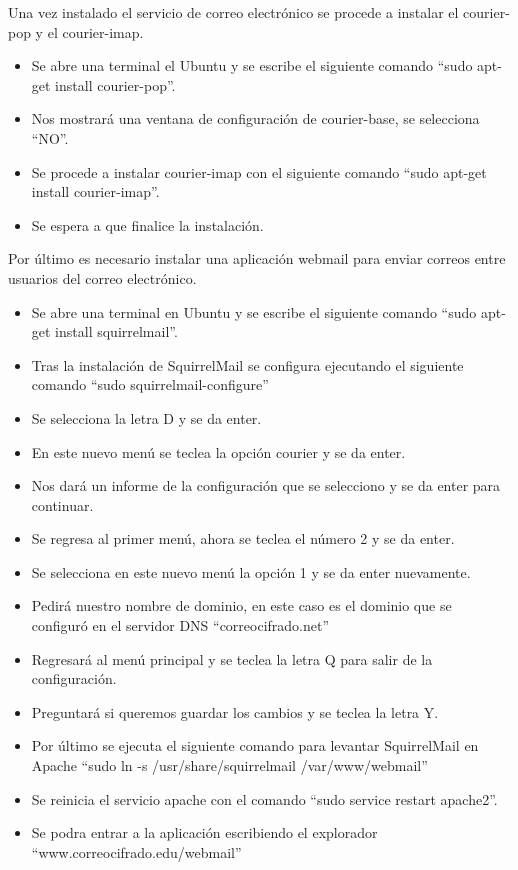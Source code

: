 Una vez instalado el servicio de correo electrónico se procede a instalar el courier-pop y el courier-imap.
\begin{itemize}
 \item Se abre una terminal el Ubuntu y se escribe el siguiente comando “sudo apt-get install courier-pop”.
 \item Nos mostrará una ventana de configuración de courier-base, se selecciona “NO”.
 \item Se procede a instalar courier-imap con el siguiente comando “sudo apt-get install courier-imap”.
 \item Se espera a que finalice la instalación.
\end{itemize}


Por último es necesario instalar una aplicación webmail para enviar correos entre usuarios del correo electrónico.
\begin{itemize}
 \item Se abre una terminal en Ubuntu y se escribe el siguiente comando “sudo apt-get install squirrelmail”.
 \item Tras la instalación de SquirrelMail se configura ejecutando el siguiente comando “sudo squirrelmail-configure”
 \item Se selecciona la letra D y se da enter.
 \item En este nuevo menú se teclea la opción courier y se da enter.
 \item Nos dará un informe de la configuración que se selecciono y se da enter para continuar.
 \item Se regresa al primer menú, ahora se teclea el número 2 y se da enter.
 \item Se selecciona en este nuevo menú la opción 1 y se da enter nuevamente.
 \item Pedirá nuestro nombre de dominio, en este caso es el dominio que se configuró en el servidor DNS “correocifrado.net”
 \item Regresará al menú principal y se teclea la letra Q para salir de la configuración.
 \item Preguntará si queremos guardar los cambios y se teclea la letra Y.
 \item Por último se ejecuta el siguiente comando para levantar SquirrelMail en Apache “sudo ln -s /usr/share/squirrelmail /var/www/webmail”
 \item Se reinicia el servicio apache con el comando “sudo service restart apache2”.
 \item Se podra entrar a la aplicación escribiendo el explorador “www.correocifrado.edu/webmail”
\end{itemize}


